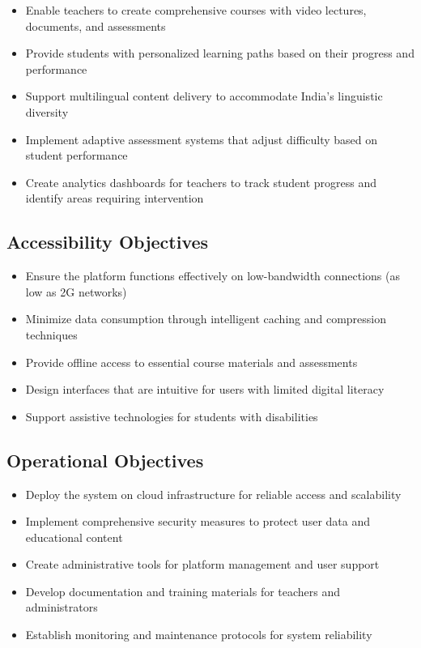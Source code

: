 \documentclass[12pt,a4paper]{report}
\begin{document}
\begin{itemize}
    \item Enable teachers to create comprehensive courses with video lectures, documents, and assessments
    \item Provide students with personalized learning paths based on their progress and performance
    \item Support multilingual content delivery to accommodate India's linguistic diversity
    \item Implement adaptive assessment systems that adjust difficulty based on student performance
    \item Create analytics dashboards for teachers to track student progress and identify areas requiring intervention
\end{itemize}

\subsection{Accessibility Objectives}

\begin{itemize}
    \item Ensure the platform functions effectively on low-bandwidth connections (as low as 2G networks)
    \item Minimize data consumption through intelligent caching and compression techniques
    \item Provide offline access to essential course materials and assessments
    \item Design interfaces that are intuitive for users with limited digital literacy
    \item Support assistive technologies for students with disabilities
\end{itemize}

\subsection{Operational Objectives}

\begin{itemize}
    \item Deploy the system on cloud infrastructure for reliable access and scalability
    \item Implement comprehensive security measures to protect user data and educational content
    \item Create administrative tools for platform management and user support
    \item Develop documentation and training materials for teachers and administrators
    \item Establish monitoring and maintenance protocols for system reliability
\end{itemize}
\end{document}
